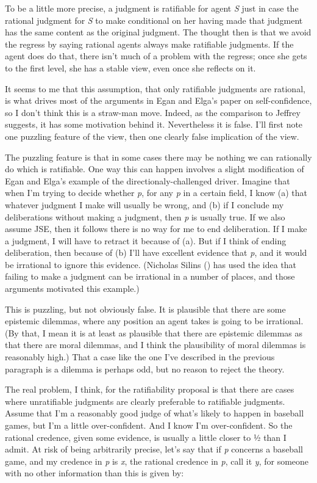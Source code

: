 \documentclass[
  10pt,
  letterpaper,
  DIV=11,
  numbers=noendperiod,
  twoside]{scrartcl}
\begin{document}
To be a little more precise, a judgment is ratifiable for agent \emph{S}
just in case the rational judgment for \emph{S} to make conditional on
her having made that judgment has the same content as the original
judgment. The thought then is that we avoid the regress by saying
rational agents always make ratifiable judgments. If the agent does do
that, there isn't much of a problem with the regress; once she gets to
the first level, she has a stable view, even once she reflects on it.

It seems to me that this assumption, that only ratifiable judgments are
rational, is what drives most of the arguments in Egan and Elga's paper
on self-confidence, so I don't think this is a straw-man move. Indeed,
as the comparison to Jeffrey suggests, it has some motivation behind it.
Nevertheless it is false. I'll first note one puzzling feature of the
view, then one clearly false implication of the view.

The puzzling feature is that in some cases there may be nothing we can
rationally do which is ratifiable. One way this can happen involves a
slight modification of Egan and Elga's example of the
directionaly-challenged driver. Imagine that when I'm trying to decide
whether \emph{p}, for any \emph{p} in a certain field, I know (a) that
whatever judgment I make will usually be wrong, and (b) if I conclude my
deliberations without making a judgment, then \emph{p} is usually true.
If we also assume JSE, then it follows there is no way for me to end
deliberation. If I make a judgment, I will have to retract it because of
(a). But if I think of ending deliberation, then because of (b) I'll
have excellent evidence that \emph{p}, and it would be irrational to
ignore this evidence. (Nicholas Silins ()
has used the idea that failing to make a judgment can be irrational in a
number of places, and those arguments motivated this example.)

This is puzzling, but not obviously false. It is plausible that there
are some epistemic dilemmas, where any position an agent takes is going
to be irrational. (By that, I mean it is at least as plausible that
there are epistemic dilemmas as that there are moral dilemmas, and I
think the plausibility of moral dilemmas is reasonably high.) That a
case like the one I've described in the previous paragraph is a dilemma
is perhaps odd, but no reason to reject the theory.

The real problem, I think, for the ratifiability proposal is that there
are cases where unratifiable judgments are clearly preferable to
ratifiable judgments. Assume that I'm a reasonably good judge of what's
likely to happen in baseball games, but I'm a little over-confident. And
I know I'm over-confident. So the rational credence, given some
evidence, is usually a little closer to ½ than I admit. At risk of being
arbitrarily precise, let's say that if \emph{p} concerns a baseball
game, and my credence in \emph{p} is \emph{x}, the rational credence in
\emph{p}, call it \emph{y}, for someone with no other information than
this is given by:
\end{document}
